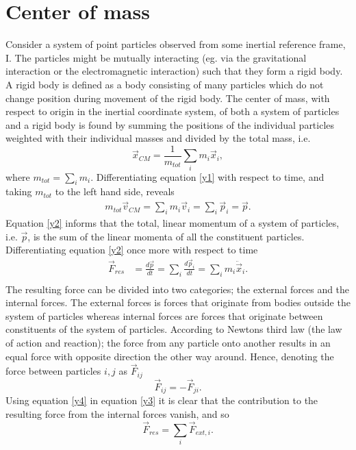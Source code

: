 \section{Center of mass}
Consider a system of point particles observed from some inertial reference frame, I. The particles might be mutually interacting (eg. via the gravitational interaction or the electromagnetic interaction) such that they form a rigid body. A rigid body is defined as a body consisting of many particles which do not change position during movement of the rigid body. The center of mass, with respect to origin in the inertial coordinate system, of both a system of particles and a rigid body is found by summing the positions of the individual particles weighted with their individual masses and divided by the total mass,  i.e.
\begin{equation}
	\vec{x}_{CM}=\frac{1}{m_{tot}}\sum_{i}m_i\vec{x}_i,
	\label{y1}
\end{equation} 
where $m_{tot}=\sum_i m_i$. Differentiating equation \eqref{y1} with respect to time, and taking $m_{tot}$ to the left hand side, reveals
\begin{equation}
	\begin{split}
		m_{tot}\vec{v}_{CM}=\sum_im_i\vec{v}_i=\sum_i\vec{p}_i=\vec{p}.
	\end{split}
	\label{y2}
\end{equation} 
Equation \eqref{y2} informs that the total, linear momentum of a system of particles, i.e. $\vec{p}$, is the sum of the linear momenta of all the constituent particles. Differentiating equation \eqref{y2} once more with respect to time
\begin{equation}
	\begin{split}
		\vec{F}_{res}&=\frac{d \vec{p}}{dt}=\sum_i \frac{d \vec{p}_i}{dt}=\sum_i m_i\ddot{\vec{x}}_i.\\
	\end{split}
	\label{y3}
\end{equation} 
The resulting force can be divided into two categories; the external forces and the internal forces. The external forces is forces that originate from bodies outside the system of particles whereas internal forces are forces that originate between constituents of the system of particles. According to Newtons third law (the law of action and reaction); the force from any particle onto another results in an equal force with opposite direction the other way around. Hence, denoting the force between particles $i,j$ as $\vec{F}_{ij}$
\begin{equation}
	\vec{F}_{ij}=-\vec{F}_{ji}.
	\label{y4}
\end{equation} 
Using equation \eqref{y4} in equation \eqref{y3} it is clear that the contribution to the resulting force from the internal forces vanish, and so
\begin{equation}
	\vec{F}_{res}=\sum_i\vec{F}_{ext,i}.
	\label{y5}
\end{equation} 
